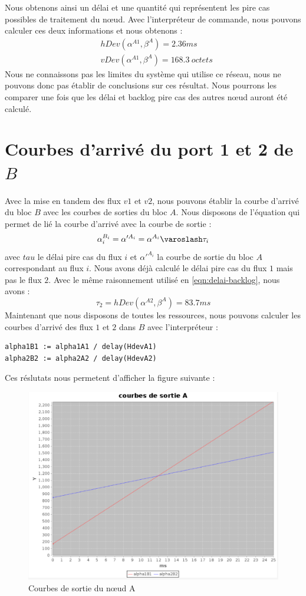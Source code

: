 Nous obtenons ainsi un délai et une quantité qui représentent les pire cas possibles de traitement du nœud. Avec l'interpréteur de commande, nous pouvons calculer ces deux informations et nous obtenons : \begin{align}\label{eqn:delai-backlog}
&hDev(\alpha^{A1},\beta^A) = 2.36 ms\\
&vDev(\alpha^{A1},\beta^A) = 168.3\ octets
\end{align}
Nous ne connaissons pas les limites du système qui utilise ce réseau, nous ne pouvons donc pas établir de conclusions sur ces résultat. Nous pourrons les comparer une fois que les délai et backlog pire cas des autres nœud auront été calculé.

\section{Courbes d'arrivé du port 1 et 2 de $B$} 
Avec la mise en tandem des flux $v1$ et $v2$, nous pouvons établir la courbe d'arrivé du bloc $B$ avec les courbes de sorties du bloc $A$. Nous disposons de l'équation qui permet de lié la courbe d'arrivé avec la courbe de sortie :
 \begin{equation}
\alpha_i^{B_i} = \alpha'^{A_i} = \alpha^{A_i} \varoslash \tau_i
\end{equation} avec $tau$ le délai pire cas du flux $i$ et $\alpha'^{A_i}$ la courbe de sortie du bloc $A$ correspondant au flux $i$. Nous avons déjà calculé le délai pire cas du flux $1$ mais pas le flux $2$. Avec le même raisonnement utilisé en \ref{eqn:delai-backlog}, nous avons :
\begin{equation}
\tau_2 = hDev(\alpha^{A2}, \beta^{A}) = 83.7ms
\end{equation}
Maintenant que nous disposons de toutes les ressources, nous pouvons calculer les courbes d'arrivé des flux $1$ et $2$ dans $B$ avec l'interpréteur : \begin{verbatim}
alpha1B1 := alpha1A1 / delay(HdevA1)
alpha2B2 := alpha2A2 / delay(HdevA2)
\end{verbatim}
Ces réslutats nous permetent d'afficher la figure suivante :
\begin{figure}[!ht]
\centering
\includegraphics[width = .6\textwidth]{./I/images/sortiesA.png}
\caption{\label{fig:sortieA}Courbes de sortie du nœud A}
\end{figure} 
